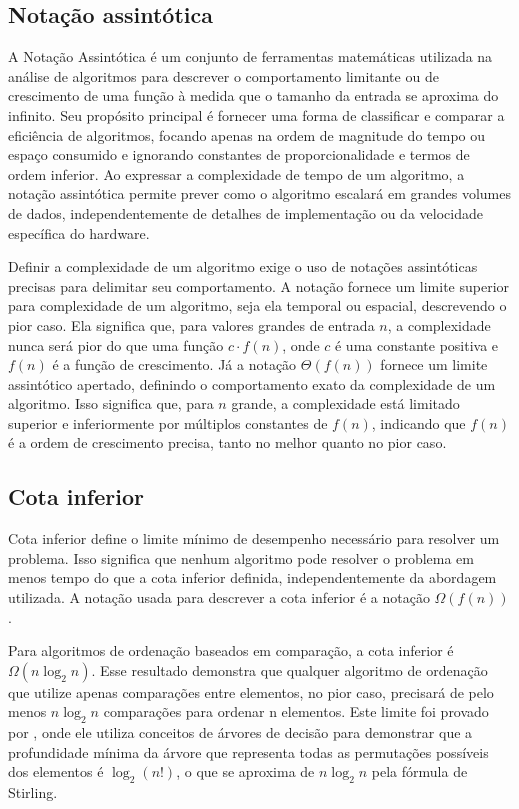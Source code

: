 \subsection{Notação assintótica}
A Notação Assintótica é um conjunto de ferramentas matemáticas utilizada na análise de algoritmos para descrever o comportamento limitante ou de crescimento de uma função à medida que o tamanho da entrada se aproxima do infinito. Seu propósito principal é fornecer uma forma de classificar e comparar a eficiência de algoritmos, focando apenas na ordem de magnitude do tempo ou espaço consumido e ignorando constantes de proporcionalidade e termos de ordem inferior. Ao expressar a complexidade de tempo de um algoritmo, a notação assintótica permite prever como o algoritmo escalará em grandes volumes de dados, independentemente de detalhes de implementação ou da velocidade específica do hardware.

Definir a complexidade de um algoritmo exige o uso de notações assintóticas precisas para delimitar seu comportamento. A notação  fornece um limite superior para complexidade de um algoritmo, seja ela temporal ou espacial, descrevendo o pior caso. Ela significa que, para valores grandes de entrada $n$, a complexidade nunca será pior do que uma função $c \cdot f(n)$, onde $c$ é uma constante positiva e $f(n)$ é a função de crescimento. Já a notação $\Theta(f(n))$ fornece um limite assintótico apertado, definindo o comportamento exato da complexidade de um algoritmo. Isso significa que, para $n$ grande, a complexidade está limitado superior e inferiormente por múltiplos constantes de $f(n)$, indicando que $f(n)$ é a ordem de crescimento precisa, tanto no melhor quanto no pior caso.

\subsection{Cota inferior}
Cota inferior define o limite mínimo de desempenho necessário para resolver um problema. Isso significa que nenhum algoritmo pode resolver o problema em menos tempo do que a cota inferior definida, independentemente da abordagem utilizada. A notação usada para descrever a cota inferior é a notação $\Omega(f(n))$.

Para algoritmos de ordenação baseados em comparação, a cota inferior é $\Omega(n\log_2n)$. Esse resultado demonstra que qualquer algoritmo de ordenação que utilize apenas comparações entre elementos, no pior caso, precisará de pelo menos $n\log_2n$ comparações para ordenar n elementos. Este limite foi provado por \cite{knuth1998art}, onde ele utiliza conceitos de árvores de decisão para demonstrar que a profundidade mínima da árvore que representa todas as permutações possíveis dos elementos é $\log_2(n!)$, o que se aproxima de $n\log_2n$ pela fórmula de Stirling.

